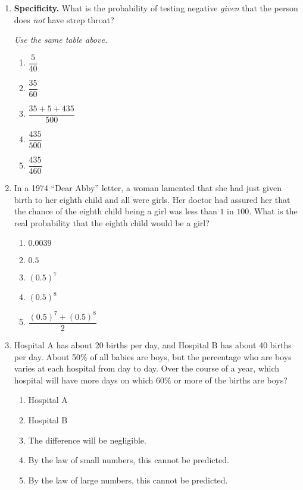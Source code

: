 \documentclass{article}
\begin{document}
\begin{enumerate}[label=\textbf{S\arabic*.}]
\item \textbf{Specificity.} What is the probability of testing negative
\emph{given} that the person does \emph{not} have strep throat? 

\textit{Use the same table above.}

\begin{enumerate}
  \item $\dfrac{5}{40}$
  \item $\dfrac{35}{60}$
  \item $\dfrac{35+5+435}{500}$
  \item $\dfrac{435}{500}$
  \item $\dfrac{435}{460}$
\end{enumerate}

\item In a 1974 ``Dear Abby'' letter, a woman lamented that she had just given
birth to her eighth child and all were girls. Her doctor had assured her that
the chance of the eighth child being a girl was less than $1$ in $100$.
What is the real probability that the eighth child would be a girl?
\begin{enumerate}
  \item $0.0039$
  \item $0.5$
  \item $(0.5)^{7}$
  \item $(0.5)^{8}$
  \item $\dfrac{(0.5)^{7}+(0.5)^{8}}{2}$
\end{enumerate}

\item Hospital A has about 20 births per day, and Hospital B has about 40 births
per day. About 50\% of all babies are boys, but the percentage who are boys
varies at each hospital from day to day. Over the course of a year, which
hospital will have more days on which 60\% or more of the births are boys?
\begin{enumerate}
  \item Hospital A
  \item Hospital B
  \item The difference will be negligible.
  \item By the law of small numbers, this cannot be predicted.
  \item By the law of large numbers, this cannot be predicted.
\end{enumerate}


\end{enumerate}
\end{document}
